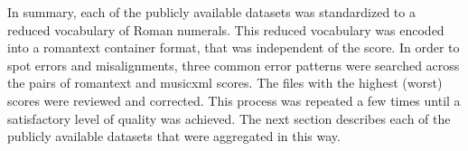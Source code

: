 
In summary, each of the publicly available datasets was
standardized to a reduced vocabulary of Roman numerals. This
reduced vocabulary was encoded into a \gls{romantext}
container format, that was independent of the score. In
order to spot errors and misalignments, three common error
patterns were searched across the pairs of \gls{romantext}
and \gls{musicxml} scores. The files with the highest
(worst) scores were reviewed and corrected. This process was
repeated a few times until a satisfactory level of quality
was achieved. The next section describes each of the
publicly available datasets that were aggregated in this
way.

